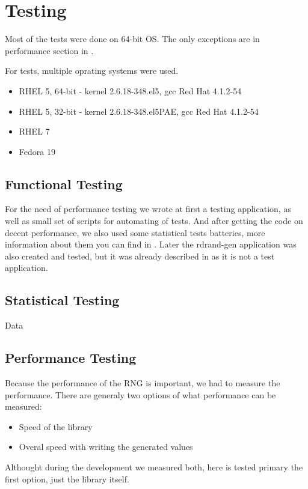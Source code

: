 
\chapter{Testing} \label{chap:testing}
Most of the tests were done on 64-bit OS. The only exceptions are in performance section in .

For tests, multiple oprating systems were used.
\begin{itemize}
 \item RHEL 5, 64-bit - kernel 2.6.18-348.el5, gcc Red Hat 4.1.2-54
 \item RHEL 5, 32-bit - kernel 2.6.18-348.el5PAE, gcc Red Hat 4.1.2-54
 \item RHEL 7
 \item Fedora 19
\end{itemize}


\section{Functional Testing} \label{sec:functional-testing}
For the need of performance testing we wrote at first a testing application, as well as small set of scripts for automating of tests. And after getting the code on decent performance, we also used some statistical tests batteries, more information about them you can find in . Later the rdrand-gen application was also created and tested, but it was already described in  as it is not a test application.



\section{Statistical Testing}\label{sec:statistical-testing}
Data



\section{Performance Testing} \label{sec:performance-testing}
Because the performance of the RNG is important, we had to measure the performance. There are generaly two options of what performance can be measured:
\begin{itemize}
 \item Speed of the library
 \item Overal speed with writing the generated values
\end{itemize}
Althought during the development we measured both, here is tested primary the first option, just the library itself. 

